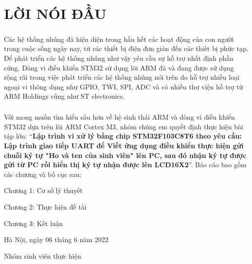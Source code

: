 
\chapter*{\hfill LỜI NÓI ĐẦU \hfill}
{}

\paragraph{}
Các hệ thống nhúng đã hiện diện trong hầu hết các hoạt động của con người trong cuộc sống ngày nay, từ các thiết bị điện đơn giản đến các thiết bị phức tạp. Để phát triển các hệ thống nhúng như vậy yêu cầu sự hỗ trợ nhất định phần cứng. Dòng vi điều khiển STM32 sử dụng lõi ARM đã và đang được sử dụng rộng rãi trong việc phát triển các hệ thống nhúng nói trên do hỗ trợ nhiều loại ngoại vi thông dụng như GPIO, TWI, SPI, ADC và có nhiều thư viện hỗ trợ từ ARM Holdings cũng như ST electronics.

\paragraph{}
Với mong muốn tìm hiểu sâu hơn về hệ sinh thái ARM và dòng vi điều khiển STM32 dựa trên lõi ARM Cortex M3, nhóm chúng em quyết định thực hiện bài tập lớn: “\textbf{Lập trình vi xử lý bằng chip STM32F103C8T6 theo yêu cầu: Lập trình giao tiếp UART để Viết ứng dụng điều khiển thực hiện gửi chuỗi ký tự "Ho và ten của sinh viên" lên PC, sau đó nhận ký tự được gửi từ PC rồi hiển thị ký tự nhận được lên LCD16X2}”. Báo cáo bao gồm các chương và bố cục sau:

\hspace{1cm}Chương 1: Cơ sở lý thuyết

\hspace{1cm}Chương 2: Thực hiện đề tài

\hspace{1cm}Chương 3: Kết luận

\vspace{1cm}

\hspace{6cm}Hà Nội, ngày 06 tháng 6 năm 2022

\vspace{2cm}

\hspace{7cm}Nhóm sinh viên thực hiện

